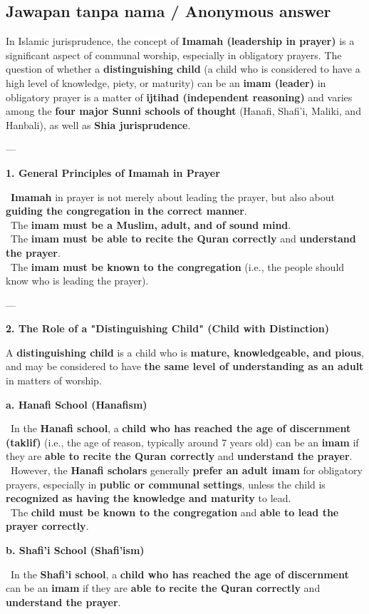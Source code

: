 \documentclass[11pt,a4paper]{article}
\begin{document}
\subsection*{Jawapan tanpa nama / Anonymous answer}
In Islamic jurisprudence, the concept of \textbf{Imamah (leadership in prayer)} is a significant aspect of communal worship, especially in obligatory prayers. The question of whether a \textbf{distinguishing child} (a child who is considered to have a high level of knowledge, piety, or maturity) can be an \textbf{imam (leader)} in obligatory prayer is a matter of \textbf{ijtihad (independent reasoning)} and varies among the \textbf{four major Sunni schools of thought} (Hanafi, Shafi'i, Maliki, and Hanbali), as well as \textbf{Shia jurisprudence}.\par\medskip ---\par\medskip \textbf{\textbf{1. General Principles of Imamah in Prayer}}\par\medskip \textbullet\ \textbf{Imamah} in prayer is not merely about leading the prayer, but also about \textbf{guiding the congregation in the correct manner}.\\ \textbullet\ The \textbf{imam must be a Muslim, adult, and of sound mind}.\\ \textbullet\ The \textbf{imam must be able to recite the Quran correctly} and \textbf{understand the prayer}.\\ \textbullet\ The \textbf{imam must be known to the congregation} (i.e., the people should know who is leading the prayer).\par\medskip ---\par\medskip \textbf{\textbf{2. The Role of a "Distinguishing Child" (Child with Distinction)}}\par\medskip A \textbf{distinguishing child} is a child who is \textbf{mature, knowledgeable, and pious}, and may be considered to have \textbf{the same level of understanding as an adult} in matters of worship.\par\medskip \textbf{\textbf{a. Hanafi School (Hanafism)}}\par\medskip \textbullet\ In the \textbf{Hanafi school}, a \textbf{child who has reached the age of discernment (taklif)} (i.e., the age of reason, typically around 7 years old) can be an \textbf{imam} if they are \textbf{able to recite the Quran correctly} and \textbf{understand the prayer}.\\ \textbullet\ However, the \textbf{Hanafi scholars} generally \textbf{prefer an adult imam} for obligatory prayers, especially in \textbf{public or communal settings}, unless the child is \textbf{recognized as having the knowledge and maturity} to lead.\\ \textbullet\ The \textbf{child must be known to the congregation} and \textbf{able to lead the prayer correctly}.\par\medskip \textbf{\textbf{b. Shafi'i School (Shafi'ism)}}\par\medskip \textbullet\ In the \textbf{Shafi'i school}, a \textbf{child who has reached the age of discernment} can be an \textbf{imam} if they are \textbf{able to recite the Quran correctly} and \textbf{understand the prayer}.
\end{document}
